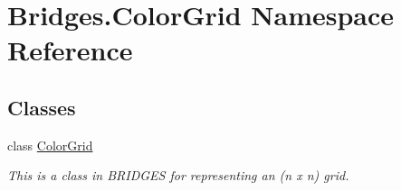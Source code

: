 \hypertarget{namespace_bridges_1_1_color_grid}{}\section{Bridges.\+Color\+Grid Namespace Reference}
\label{namespace_bridges_1_1_color_grid}
\subsection*{Classes}
\begin{DoxyCompactItemize}
\item 
class \hyperlink{class_bridges_1_1_color_grid_1_1_color_grid}{Color\+Grid}
\begin{DoxyCompactList}\small\item\em This is a class in B\+R\+I\+D\+G\+E\+S for representing an (n x n) grid. \end{DoxyCompactList}\end{DoxyCompactItemize}
